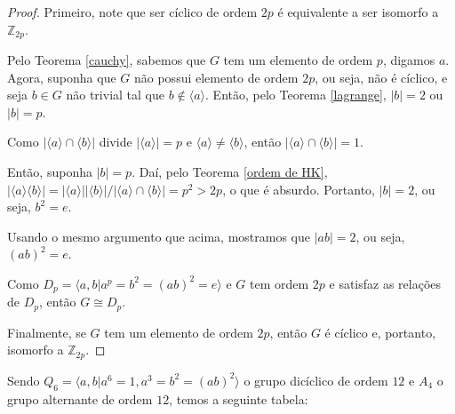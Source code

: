 \documentclass[a4paper,portuguese,11pt,twoside, leqno]{book}
\theoremstyle{definition}
\begin{document}
	\begin{proof}
		Primeiro, note que ser cíclico de ordem $2p$ é equivalente a ser isomorfo a $\mathbb{Z}_{2p}$. 
		\par\vspace{0.3cm}
		Pelo Teorema \eqref{cauchy}, sabemos que $G$ tem um elemento de ordem $p$, digamos $a$. Agora, suponha que $G$ não possui elemento de ordem $2p$, ou seja, não é cíclico, e seja $b\in G$ não trivial tal que $b\notin\langle a \rangle$. Então, pelo Teorema \eqref{lagrange}, $|b|=2$ ou $|b|=p$. 
		\par\vspace{0.3cm}
		Como $|\langle a \rangle \cap \langle b \rangle|$ divide $|\langle a \rangle|=p$ e $\langle a \rangle\neq\langle b \rangle$, então $|\langle a \rangle \cap \langle b \rangle|=1$. 
		\par\vspace{0.3cm}
		Então, suponha $|b|=p$. Daí, 
		pelo Teorema \eqref{ordem de HK},	
		$|\langle a \rangle \langle b \rangle| = |\langle a\rangle||\langle b\rangle|/|\langle a\rangle\cap \langle b \rangle|=p^2>2p$, o que é absurdo. Portanto, $|b|=2$, ou seja, $b^2 = e$.
		\par\vspace{0.3cm}
		Usando o mesmo argumento que acima, mostramos que $|ab|=2$, ou seja, $(ab)^2 = e$. 
		\par\vspace{0.3cm}
		Como $D_p=\langle a,b|a^p=b^2=(ab)^2=e\rangle$ e $G$ tem ordem $2p$ e satisfaz as relações de $D_p$, então $G\cong D_p$.
		\par\vspace{0.3cm}
		Finalmente, se $G$ tem um elemento de ordem $2p$, então $G$ é cíclico e, portanto, isomorfo a $\mathbb{Z}_{2p}$.
	\end{proof}
	
	\par\vspace{0.3cm} Sendo $Q_6 = \langle a,b|a^6=1, a^3=b^2=(ab)^2 \rangle$ o grupo dicíclico de ordem $12$ e $A_4$ o grupo alternante de ordem $12$, temos a seguinte tabela:
	
\end{document}
